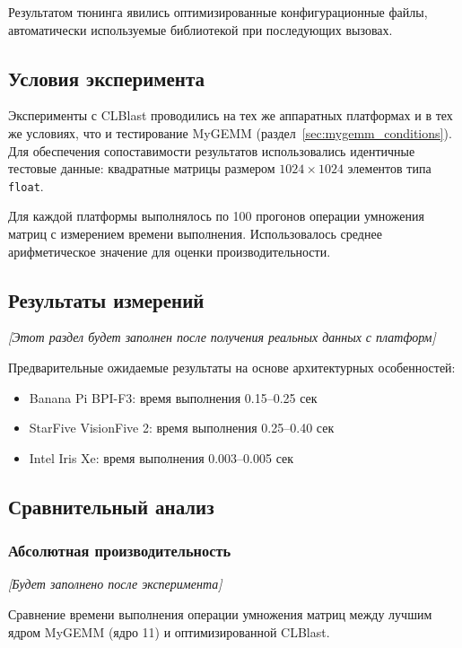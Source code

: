Результатом тюнинга явились оптимизированные конфигурационные файлы, автоматически используемые библиотекой при последующих вызовах.

\subsection{Условия эксперимента}

Эксперименты с CLBlast проводились на тех же аппаратных платформах и в тех же условиях, что и тестирование MyGEMM (раздел~\ref{sec:mygemm_conditions}). Для обеспечения сопоставимости результатов использовались идентичные тестовые данные: квадратные матрицы размером $1024 \times 1024$ элементов типа \texttt{float}.

Для каждой платформы выполнялось по 100 прогонов операции умножения матриц с измерением времени выполнения. Использовалось среднее арифметическое значение для оценки производительности.

\subsection{Результаты измерений}

\textit{[Этот раздел будет заполнен после получения реальных данных с платформ]}

Предварительные ожидаемые результаты на основе архитектурных особенностей:
\begin{itemize}
    \item Banana Pi BPI-F3: время выполнения 0.15--0.25 сек
    \item StarFive VisionFive 2: время выполнения 0.25--0.40 сек  
    \item Intel Iris Xe: время выполнения 0.003--0.005 сек
\end{itemize}

\subsection{Сравнительный анализ}

\subsubsection{Абсолютная производительность}

\textit{[Будет заполнено после эксперимента]}

Сравнение времени выполнения операции умножения матриц между лучшим ядром MyGEMM (ядро 11) и оптимизированной CLBlast.

